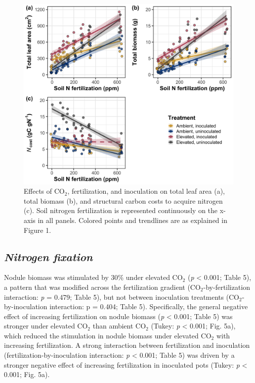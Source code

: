 \newpage
\begin{figure}
    \centering
    \includegraphics[scale = 0.075]{ch5_NxCO2xI/figs/NxCO2xI_fig4_wholePlant.png}
    \caption[Effects of CO$_2$, fertilization, and inoculation on total leaf area, total biomass, and structural carbon costs to acquire nitrogen.]{Effects of CO$_2$, fertilization, and inoculation on total leaf area (a), total biomass (b), and structural carbon costs to acquire nitrogen (c). Soil nitrogen fertilization is represented continuously on the x-axis in all panels. Colored points and trendlines are as explained in Figure 1.}
    \label{fig:figure5.4}
\end{figure}
\clearpage

\subsection{\textit{Nitrogen fixation}}
Nodule biomass was stimulated by 30\% under elevated CO$_2$ (\textit{p} < 0.001; Table 5), a pattern that was modified across the fertilization gradient (CO$_2$-by-fertilization interaction: \textit{p} = 0.479; Table 5), but not between inoculation treatments (CO$_2$-by-inoculation interaction: p = 0.404; Table 5). Specifically, the general negative effect of increasing fertilization on nodule biomass (\textit{p} < 0.001; Table 5) was stronger under elevated CO$_2$ than ambient CO$_2$ (Tukey: \textit{p} < 0.001; Fig. 5a), which reduced the stimulation in nodule biomass under elevated CO$_2$ with increasing fertilization. A strong interaction between fertilization and inoculation (fertilization-by-inoculation interaction: \textit{p} < 0.001; Table 5) was driven by a stronger negative effect of increasing fertilization in inoculated pots (Tukey: \textit{p} < 0.001; Fig. 5a).


